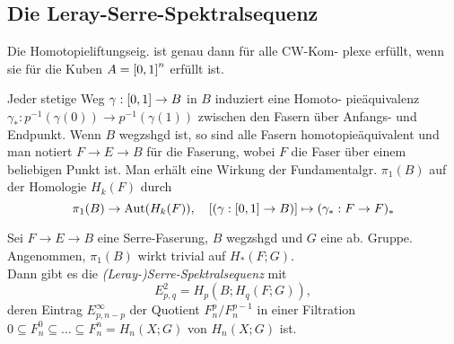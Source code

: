 \documentclass{cheat-sheet}
\newenvironment{centertikzcd}
  {\begin{center}\begin{tikzcd}}
  {\end{tikzcd}\end{center}}
\begin{document}
\subsection{Die Leray-Serre-Spektralsequenz}


\begin{lem}
  Die Homotopieliftungseig. ist genau dann für alle CW-Kom- plexe erfüllt, wenn sie für die Kuben $A = \left[ 0, 1 \right]^n$ erfüllt ist.
\end{lem}

\begin{bem}
  Jeder stetige Weg $\gamma : \left[ 0, 1 \right] \to B$ in $B$ induziert eine Homoto- pieäquivalenz $\gamma_* : p^{-1}(\gamma(0)) \to p^{-1}(\gamma(1))$ zwischen den Fasern über Anfangs- und Endpunkt.
  Wenn $B$ wegzshgd ist, so sind alle Fasern homotopieäquivalent und man notiert $F \to E \to B$ für die Faserung, wobei $F$ die Faser über einem beliebigen Punkt ist. Man erhält eine Wirkung der Fundamentalgr. $\pi_1(B)$ auf der Homologie $H_k(F)$ durch
  \[ \pi_1(B) \to \operatorname{Aut}(H_k(F)), \quad [(\gamma : \left[ 0, 1 \right] \to B)] \mapsto (\gamma_* : F \to F)_* \]
\end{bem}

\begin{thm}
  Sei $F \to E \to B$ eine Serre-Faserung, $B$ wegzshgd und $G$ eine ab. Gruppe. Angenommen, $\pi_1(B)$ wirkt trivial auf $H_*(F; G)$. \\
  Dann gibt es die \emph{(Leray-)Serre-Spektralsequenz} mit
  \[ E^2_{p,q} = H_p(B; H_q(F; G)), \]
  deren Eintrag $E^\infty_{p,n-p}$ der Quotient $F^p_n/F^{p-1}_n$ in einer Filtration
  $0 \subseteq F_n^0 \subseteq \ldots \subseteq F_n^n = H_n(X; G)$ von $H_n(X; G)$ ist.
\end{thm}
\end{document}
